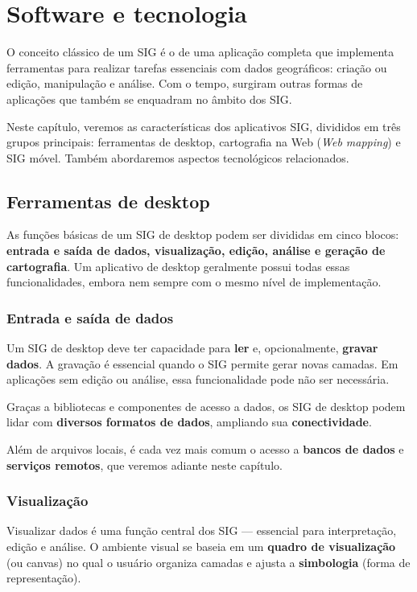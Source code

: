 \chapter{Software e tecnologia}

\pagestyle{fancy}

O conceito clássico de um SIG é o de uma aplicação completa que implementa ferramentas para realizar tarefas essenciais com dados geográficos: criação ou edição, manipulação e análise. Com o tempo, surgiram outras formas de aplicações que também se enquadram no âmbito dos SIG.

Neste capítulo, veremos as características dos aplicativos SIG, divididos em três grupos principais: ferramentas de desktop, cartografia na Web (\emph{Web mapping}) e SIG móvel. Também abordaremos aspectos tecnológicos relacionados.

\section{Ferramentas de desktop}

As funções básicas de um SIG de desktop podem ser divididas em cinco blocos: \textbf{entrada e saída de dados, visualização, edição, análise e geração de cartografia}. Um aplicativo de desktop geralmente possui todas essas funcionalidades, embora nem sempre com o mesmo nível de implementação.

\subsection{Entrada e saída de dados}

Um SIG de desktop deve ter capacidade para \textbf{ler} e, opcionalmente, \textbf{gravar dados}. A gravação é essencial quando o SIG permite gerar novas camadas. Em aplicações sem edição ou análise, essa funcionalidade pode não ser necessária.

Graças a bibliotecas e componentes de acesso a dados, os SIG de desktop podem lidar com \textbf{diversos formatos de dados}, ampliando sua \textbf{conectividade}.

Além de arquivos locais, é cada vez mais comum o acesso a \textbf{bancos de dados} e \textbf{serviços remotos}, que veremos adiante neste capítulo.

\subsection{Visualização}

Visualizar dados é uma função central dos SIG — essencial para interpretação, edição e análise. O ambiente visual se baseia em um \textbf{quadro de visualização} (ou canvas) no qual o usuário organiza camadas e ajusta a \textbf{simbologia} (forma de representação).

